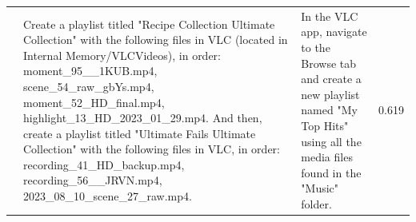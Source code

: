 \documentclass{article} %
\begin{document}
\begin{scriptsize}
\begin{longtable}{@{} c >{\raggedright\arraybackslash}p{} >{\raggedright\arraybackslash}p{} c @{}}
\addlinespace[2pt]
116 & Create a playlist titled "Recipe Collection Ultimate Collection" with the following files in VLC (located in Internal Memory/VLCVideos), in order: moment\_95\_\_1KUB.mp4, scene\_54\_raw\_gbYs.mp4, moment\_52\_HD\_final.mp4, highlight\_13\_HD\_2023\_01\_29.mp4. And then, create a playlist titled "Ultimate Fails Ultimate Collection" with the following files in VLC, in order: recording\_41\_HD\_backup.mp4, recording\_56\_\_JRVN.mp4, 2023\_08\_10\_scene\_27\_raw.mp4. & In the VLC app, navigate to the Browse tab and create a new playlist named "My Top Hits" using all the media files found in the "Music" folder. & 0.619 \\
\end{longtable}
\end{scriptsize}
\end{document}
